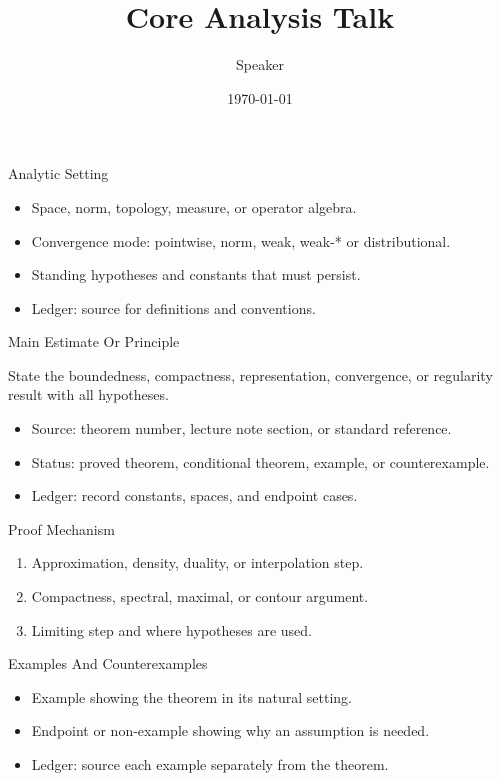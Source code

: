 \documentclass[10pt,aspectratio=169]{beamer}
\title{Core Analysis Talk}
\author{Speaker}
\date{\today}
\begin{document}
\begin{frame}\titlepage\end{frame}

\begin{frame}{Analytic Setting}
  \begin{itemize}
    \item Space, norm, topology, measure, or operator algebra.
    \item Convergence mode: pointwise, norm, weak, weak-* or distributional.
    \item Standing hypotheses and constants that must persist.
    \item Ledger: source for definitions and conventions.
  \end{itemize}
\end{frame}

\begin{frame}{Main Estimate Or Principle}
  \begin{theorem}
    State the boundedness, compactness, representation, convergence, or
    regularity result with all hypotheses.
  \end{theorem}
  \begin{itemize}
    \item Source: theorem number, lecture note section, or standard reference.
    \item Status: proved theorem, conditional theorem, example, or counterexample.
    \item Ledger: record constants, spaces, and endpoint cases.
  \end{itemize}
\end{frame}

\begin{frame}{Proof Mechanism}
  \begin{enumerate}
    \item Approximation, density, duality, or interpolation step.
    \item Compactness, spectral, maximal, or contour argument.
    \item Limiting step and where hypotheses are used.
  \end{enumerate}
\end{frame}

\begin{frame}{Examples And Counterexamples}
  \begin{itemize}
    \item Example showing the theorem in its natural setting.
    \item Endpoint or non-example showing why an assumption is needed.
    \item Ledger: source each example separately from the theorem.
  \end{itemize}
\end{frame}
\end{document}

